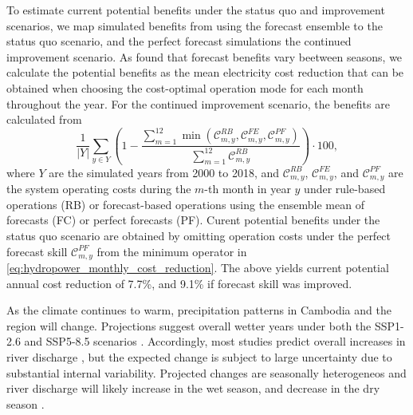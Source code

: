 \documentclass[
  final,
  10pt,
  letterpaper,
  english,
]{article}
\begin{document}
To estimate current potential benefits under the status quo and improvement
scenarios, we map simulated benefits from using the forecast ensemble to the
status quo scenario, and the perfect forecast simulations the continued
improvement scenario. As \cite{koh_evaluating_2024} found that forecast benefits
vary beetween seasons, we calculate the potential benefits as the mean electricity cost
reduction that can be obtained when choosing the cost-optimal operation mode for
each month throughout the year. For the continued improvement scenario, the
benefits are calculated from
\begin{equation}
  \frac{1}{|Y|}\sum_{y\in Y} \left(1 - \frac{\sum_{m=1}^{12} \min{\left(\mathcal{C}_{m,y}^{RB}, \mathcal{C}_{m,y}^{FE}, \mathcal{C}_{m,y}^{PF}\right)}}{\sum_{m=1}^{12} \mathcal{C}_{m,y}^{RB}}\right) \cdot 100,
  \label{eq:hydropower_monthly_cost_reduction}
\end{equation}
where $Y$ are the simulated years from 2000 to 2018, and
$\mathcal{C}_{m,y}^{RB}$, $\mathcal{C}_{m,y}^{FE}$, and $\mathcal{C}_{m,y}^{PF}$
are the system operating costs during the $m$-th month in year $y$ under
rule-based operations (RB) or forecast-based operations using the ensemble mean
of forecasts (FC) or perfect forecasts (PF). Curent potential benefits under the
status quo scenario are obtained by omitting operation costs under the perfect
forecast skill $\mathcal{C}_{m,y}^{PF}$ from the minimum operator in
\cref{eq:hydropower_monthly_cost_reduction}. The above yields current potential
annual cost reduction of 7.7\%, and 9.1\% if forecast skill was improved.

As the climate continues to warm, precipitation patterns in Cambodia and the
region will change. Projections suggest overall wetter years under both the
SSP1-2.6 and SSP5-8.5 scenarios \parencite{wb2025ckp}. Accordingly, most studies
predict overall increases in river discharge
\parencite{inseeyong2025evaluation,ly2023integrated,hoang2016mekong}, but the
expected change is subject to large uncertainty \parencite{oeurng2019assessing}
due to substantial internal variability. Projected changes are seasonally heterogeneos
and river discharge will likely increase in the wet season, and decrease in the dry season
\parencite{inseeyong2025evaluation,horton2022cambodian,li2021assessment}. 
\end{document}
